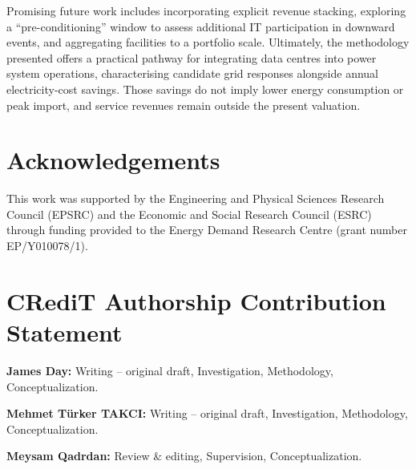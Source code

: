 \documentclass[lettersize,journal]{IEEEtran}
\begin{document}
Promising future work includes incorporating explicit revenue stacking, exploring a ``pre-conditioning'' window to assess additional IT participation in downward events, and aggregating facilities to a portfolio scale. Ultimately, the methodology presented offers a practical pathway for integrating data centres into power system operations, characterising candidate grid responses alongside annual electricity-cost savings. Those savings do not imply lower energy consumption or peak import, and service revenues remain outside the present valuation.




\section*{Acknowledgements}

This work was supported by the Engineering and Physical Sciences Research Council (EPSRC) and the Economic and Social Research Council (ESRC) through funding provided to the Energy Demand Research Centre (grant number EP/Y010078/1).

\section*{CRediT Authorship Contribution Statement}

\noindent \textbf{James Day:} Writing – original draft, Investigation, Methodology, Conceptualization.

\medskip
\noindent \textbf{Mehmet Türker TAKCI:} Writing – original draft, Investigation, Methodology, Conceptualization.


\medskip
\noindent \textbf{Meysam Qadrdan:} Review \& editing, Supervision, Conceptualization.
\end{document}

